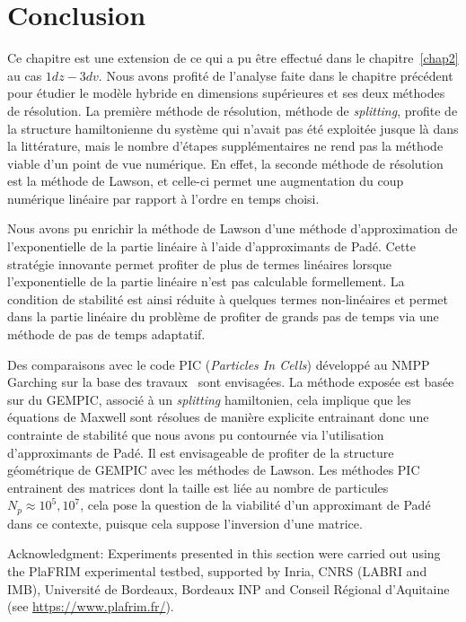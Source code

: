 
\section{Conclusion}

Ce chapitre est une extension de ce qui a pu être effectué dans le chapitre~\ref{chap2} au cas $1dz-3dv$. Nous avons profité de l'analyse faite dans le chapitre précédent pour étudier le modèle hybride en dimensions supérieures et ses deux méthodes de résolution. La première méthode de résolution, méthode de \emph{splitting}, profite de la structure hamiltonienne du système qui n'avait pas été exploitée jusque là dans la littérature, mais le nombre d'étapes supplémentaires ne rend pas la méthode viable d'un point de vue numérique. En effet, la seconde méthode de résolution est la méthode de Lawson, et celle-ci permet une augmentation du coup numérique linéaire par rapport à l'ordre en temps choisi.

Nous avons pu enrichir la méthode de Lawson d'une méthode d'approximation de l'exponentielle de la partie linéaire à l'aide d'approximants de Padé. Cette stratégie innovante permet profiter de plus de termes linéaires lorsque l'exponentielle de la partie linéaire n'est pas calculable formellement. La condition de stabilité est ainsi réduite à quelques termes non-linéaires et permet dans la partie linéaire du problème de profiter de grands pas de temps via une méthode de pas de temps adaptatif.

Des comparaisons avec le code PIC (\emph{Particles In Cells}) développé au NMPP Garching sur la base des travaux~\cite{Holderied:2020} sont envisagées. La méthode exposée est basée sur du GEMPIC, associé à un \emph{splitting} hamiltonien, cela implique que les équations de Maxwell sont résolues de manière explicite entrainant donc une contrainte de stabilité que nous avons pu contournée via l'utilisation d'approximants de Padé. Il est envisageable de profiter de la structure géométrique de GEMPIC avec les méthodes de Lawson. Les méthodes PIC entrainent des matrices dont la taille est liée au nombre de particules $N_p\approx 10^5,10^7$, cela pose la question de la viabilité d'un approximant de Padé dans ce contexte, puisque cela suppose l'inversion d'une matrice.

\vfill

\begin{otherlanguage}{english}
Acknowledgment: Experiments presented in this section were carried out using the PlaFRIM experimental testbed, supported by Inria, CNRS (LABRI and IMB), Université de Bordeaux, Bordeaux INP and Conseil Régional d’Aquitaine (see \url{https://www.plafrim.fr/}).
\end{otherlanguage}
